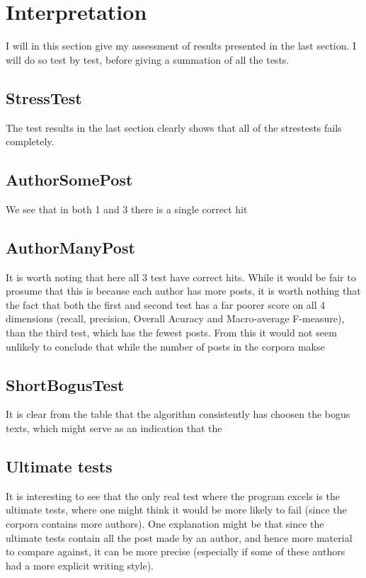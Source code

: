 \section{Interpretation}
I will in this section give my assessment of results presented in the last section. I will do so test by test, before giving a summation of all the tests.

\subsection{StressTest}
The test results in the last section clearly shows that all of the strestests fails completely.

\subsection{AuthorSomePost}
We see that in both 1 and 3 there is a single correct hit


\subsection{AuthorManyPost}
It is worth noting that here all 3 test have correct hits. While it would be fair to prosume that this is because each author has more posts, it is worth nothing that the fact that both the first and second test has a far poorer score on all 4 dimensions (recall, precision, Overall Acuracy and Macro-average F-measure), than the third test, which has the fewest posts. From this it would not seem unlikely to conclude that while the number of posts in the corpora makse 

\subsection{ShortBogusTest}
It is clear from the table that the algorithm consistently has choosen the bogus texts, which might serve as an indication that the 

\subsection{Ultimate tests}
It is interesting to see that the only real test where the program excels is the ultimate tests, where one might think it would be more likely to fail (since the corpora contains more authors). One explanation might be that since the ultimate tests contain all the post made by an author, and hence more material to compare against, it can be more precise (especially if some of these authors had a more explicit writing style).

